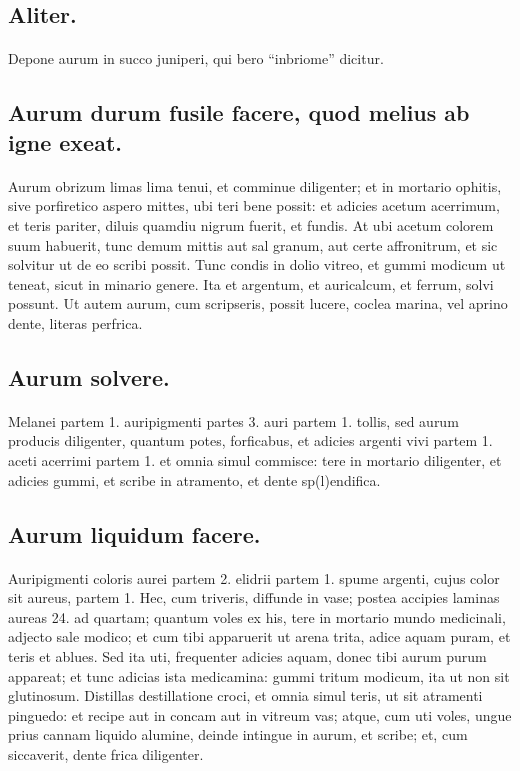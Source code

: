 \documentclass[a4paper, 11pt, oneside, polutonikogreek, italian]{article}
\begin{document}
\subsection{Aliter.}
\paragraph{}
Depone aurum in succo juniperi, qui bero ``inbriome'' dicitur.

\subsection{Aurum durum fusile facere, quod melius ab igne exeat.}
\paragraph{}
Aurum obrizum limas lima tenui, et comminue diligenter; et in mortario ophitis, sive porfiretico aspero mittes, ubi teri bene possit: et adicies acetum acerrimum, et teris pariter, diluis quamdiu nigrum fuerit, et fundis. At ubi acetum colorem suum habuerit, tunc demum mittis aut sal granum, aut certe affronitrum, et sic solvitur ut de eo scribi possit. Tunc condis in dolio vitreo, et gummi modicum ut teneat, sicut in minario genere. Ita et argentum, et auricalcum, et ferrum, solvi possunt. Ut autem aurum, cum scripseris, possit lucere, coclea marina, vel aprino dente, literas perfrica.

\subsection{Aurum solvere.}
\paragraph{}
Melanei partem 1. auripigmenti partes 3. auri partem 1. tollis, sed aurum producis diligenter, quantum potes, forficabus, et adicies argenti vivi partem 1. aceti acerrimi partem 1. et omnia simul commisce: tere in mortario diligenter, et adicies gummi, et scribe in atramento, et dente sp(l)endifica.

\subsection{Aurum liquidum facere.}
\paragraph{}
Auripigmenti coloris aurei partem 2. elidrii partem 1. spume argenti, cujus color sit aureus, partem 1. Hec, cum triveris, diffunde in vase; postea accipies laminas aureas 24. ad quartam; quantum voles ex his, tere in mortario mundo medicinali, adjecto sale modico; et cum tibi apparuerit ut arena trita, adice aquam puram, et teris et ablues. Sed ita uti, frequenter adicies aquam, donec tibi aurum purum appareat; et tunc adicias ista medicamina: gummi tritum modicum, ita ut non sit glutinosum. Distillas destillatione croci, et omnia simul teris, ut sit atramenti pinguedo: et recipe aut in concam aut in vitreum vas; atque, cum uti voles, ungue prius cannam liquido alumine, deinde intingue in aurum, et scribe; et, cum siccaverit, dente frica diligenter.
\end{document}
